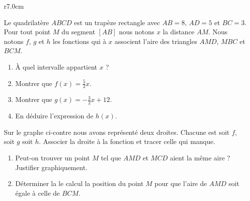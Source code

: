
\begin{exercice}\label{exosmath-0552}

\begin{wrapfigure}{r}{7.0cm}
   \vspace{-0.5cm}        %
   \centering
   

   
\end{wrapfigure}

    Le quadrilatère \( ABCD\) est un trapèze rectangle avec \( AB=8\), \( AD=5\) et \( BC=3\). Pour tout point \( M\) du segment \( [AB]\) nous notons \( x\) la distance \( AM\). Nous notons \( f\), \( g\) et \( h\) les fonctions qui à \( x\) associent l'aire des triangles \( AMD\), \( MBC\) et \( BCM\).
    \begin{enumerate}
        \item
            À quel intervalle appartient \( x\) ?
        \item
            Montrer que \( f(x)=\frac{ 5 }{2}x\).
        \item
            Montrer que \( g(x)=-\frac{ 3 }{2}x+12\).
        \item
            En déduire l'expression de \( h(x)\).
    \end{enumerate}
    Sur le graphe ci-contre nous avons représenté deux droites. Chacune est soit \( f\), soit \( g\) soit \( h\). Associer la droite à la fonction et tracer celle qui manque.



    \begin{enumerate}
        \item
            Peut-on trouver un point \( M\) tel que \( AMD\) et \( MCD\) aient la même aire ? Justifier graphiquement.
        \item
            Déterminer la le calcul la position du point \( M\) pour que l'aire de \( AMD\) soit égale à celle de \( BCM\).
    \end{enumerate}



\end{exercice}
